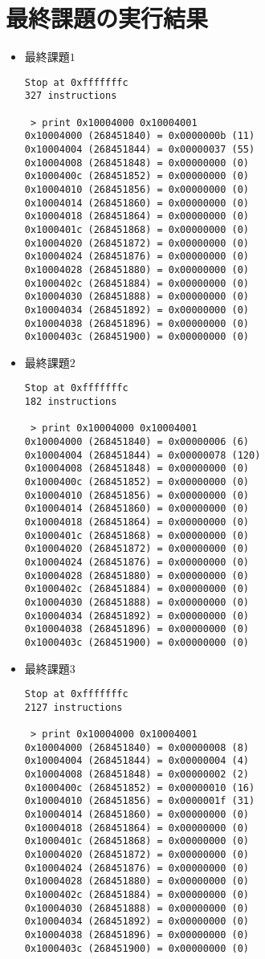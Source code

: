 \documentclass{jarticle}[11pt]
\begin{document}
\section{最終課題の実行結果}
\begin{itemize}
\item 最終課題$1$
\begin{verbatim}
Stop at 0xfffffffc
327 instructions

 > print 0x10004000 0x10004001
0x10004000 (268451840) = 0x0000000b (11)
0x10004004 (268451844) = 0x00000037 (55)
0x10004008 (268451848) = 0x00000000 (0)
0x1000400c (268451852) = 0x00000000 (0)
0x10004010 (268451856) = 0x00000000 (0)
0x10004014 (268451860) = 0x00000000 (0)
0x10004018 (268451864) = 0x00000000 (0)
0x1000401c (268451868) = 0x00000000 (0)
0x10004020 (268451872) = 0x00000000 (0)
0x10004024 (268451876) = 0x00000000 (0)
0x10004028 (268451880) = 0x00000000 (0)
0x1000402c (268451884) = 0x00000000 (0)
0x10004030 (268451888) = 0x00000000 (0)
0x10004034 (268451892) = 0x00000000 (0)
0x10004038 (268451896) = 0x00000000 (0)
0x1000403c (268451900) = 0x00000000 (0)
\end{verbatim}

\item 最終課題$2$
\begin{verbatim}
Stop at 0xfffffffc
182 instructions

 > print 0x10004000 0x10004001
0x10004000 (268451840) = 0x00000006 (6)
0x10004004 (268451844) = 0x00000078 (120)
0x10004008 (268451848) = 0x00000000 (0)
0x1000400c (268451852) = 0x00000000 (0)
0x10004010 (268451856) = 0x00000000 (0)
0x10004014 (268451860) = 0x00000000 (0)
0x10004018 (268451864) = 0x00000000 (0)
0x1000401c (268451868) = 0x00000000 (0)
0x10004020 (268451872) = 0x00000000 (0)
0x10004024 (268451876) = 0x00000000 (0)
0x10004028 (268451880) = 0x00000000 (0)
0x1000402c (268451884) = 0x00000000 (0)
0x10004030 (268451888) = 0x00000000 (0)
0x10004034 (268451892) = 0x00000000 (0)
0x10004038 (268451896) = 0x00000000 (0)
0x1000403c (268451900) = 0x00000000 (0)
\end{verbatim}

\item 最終課題$3$
\begin{verbatim}
Stop at 0xfffffffc
2127 instructions

 > print 0x10004000 0x10004001
0x10004000 (268451840) = 0x00000008 (8)
0x10004004 (268451844) = 0x00000004 (4)
0x10004008 (268451848) = 0x00000002 (2)
0x1000400c (268451852) = 0x00000010 (16)
0x10004010 (268451856) = 0x0000001f (31)
0x10004014 (268451860) = 0x00000000 (0)
0x10004018 (268451864) = 0x00000000 (0)
0x1000401c (268451868) = 0x00000000 (0)
0x10004020 (268451872) = 0x00000000 (0)
0x10004024 (268451876) = 0x00000000 (0)
0x10004028 (268451880) = 0x00000000 (0)
0x1000402c (268451884) = 0x00000000 (0)
0x10004030 (268451888) = 0x00000000 (0)
0x10004034 (268451892) = 0x00000000 (0)
0x10004038 (268451896) = 0x00000000 (0)
0x1000403c (268451900) = 0x00000000 (0)
\end{verbatim}


\end{itemize}
\end{document}
